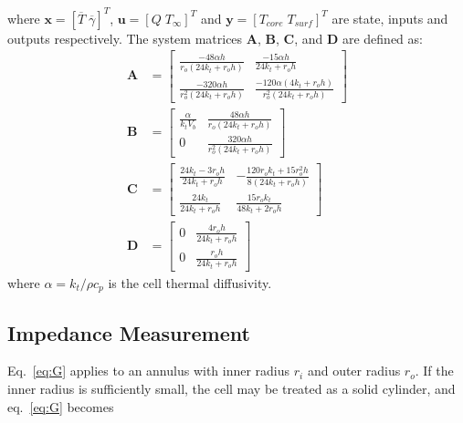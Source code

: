 \documentclass[journal, english]{IEEEtran}
\begin{document}
where $\mathbf{x}=\left[\overline{T}\;\overline{\gamma}\right]^{T}$,
$\mathbf{u}=\left[Q\; T_{\infty}\right]^{T}$ and $\mathbf{y}=\left[T_{core}\; T_{surf}\right]^{T}$
are state, inputs and outputs respectively. The system matrices $\mathbf{A}$,
$\mathbf{B}$, $\mathbf{C}$, and $\mathbf{D}$ are defined as:
\begin{equation}
\begin{aligned}\mathbf{A} & =\left[\begin{array}{cc}
\frac{-48\alpha h}{r_{o}(24k_{t}+r_{o}h)} & \frac{-15\alpha h}{24k_{t}+r_{o}h}\\
\frac{-320\alpha h}{r_{o}^{2}(24k_{t}+r_{o}h)} & \frac{-120\alpha(4k_{t}+r_{o}h)}{r_{o}^{2}(24k_{t}+r_{o}h)}
\end{array}\right]\\
\mathbf{B} & =\left[\begin{array}{cc}
\frac{\alpha}{k_{t}V_{b}} & \frac{48\alpha h}{r_{o}(24k_{t}+r_{o}h)}\\
0 & \frac{320\alpha h}{r_{o}^{2}(24k_{t}+r_{o}h)}
\end{array}\right]\\
\mathbf{C} & =\left[\begin{array}{cc}
\frac{24k_{t}-3r_{o}h}{24k_{t}+r_{o}h} & -\frac{120r_{o}k_{t}+15r_{o}^{2}h}{8(24k_{t}+r_{o}h)}\\
\frac{24k_{t}}{24k_{t}+r_{o}h} & \frac{15r_{o}k_{t}}{48k_{t}+2r_{o}h}
\end{array}\right]\\
\mathbf{D} & =\left[\begin{array}{cc}
0 & \frac{4r_{o}h}{24k_{t}+r_{o}h}\\
0 & \frac{r_{o}h}{24k_{t}+r_{o}h}
\end{array}\right]
\end{aligned}
\label{eq:State-space-model-matrices}
\end{equation}
where $\alpha = k_t/ \rho c_p$ is the cell thermal diffusivity.

\subsection{Impedance Measurement}
Eq.\ \ref{eq:G} applies to an annulus with inner radius $r_{i}$ and
outer radius $r_{o}$. If the inner radius is sufficiently small,
the cell may be treated as a solid cylinder, and eq.\ \ref{eq:G} becomes
\end{document}
